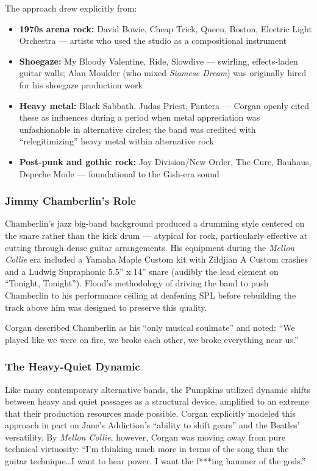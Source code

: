 \documentclass[11pt,letterpaper]{article}
\begin{document}
The approach drew explicitly from:
\begin{itemize}
  \item \textbf{1970s arena rock:} David Bowie, Cheap Trick, Queen, Boston, Electric Light Orchestra --- artists who used the studio as a compositional instrument
  \item \textbf{Shoegaze:} My Bloody Valentine, Ride, Slowdive --- swirling, effects-laden guitar walls; Alan Moulder (who mixed \textit{Siamese Dream}) was originally hired for his shoegaze production work
  \item \textbf{Heavy metal:} Black Sabbath, Judas Priest, Pantera --- Corgan openly cited these as influences during a period when metal appreciation was unfashionable in alternative circles; the band was credited with ``relegitimizing'' heavy metal within alternative rock
  \item \textbf{Post-punk and gothic rock:} Joy Division/New Order, The Cure, Bauhaus, Depeche Mode --- foundational to the Gish-era sound
\end{itemize}

\subsubsection{Jimmy Chamberlin's Role}

Chamberlin's jazz big-band background produced a drumming style centered on the snare rather than the kick drum --- atypical for rock, particularly effective at cutting through dense guitar arrangements. His equipment during the \textit{Mellon Collie} era included a Yamaha Maple Custom kit with Zildjian A Custom crashes and a Ludwig Supraphonic 5.5'' x 14'' snare (audibly the lead element on ``Tonight, Tonight''). Flood's methodology of driving the band to push Chamberlin to his performance ceiling at deafening SPL before rebuilding the track above him was designed to preserve this quality.

Corgan described Chamberlin as his ``only musical soulmate'' and noted: ``We played like we were on fire, we broke each other, we broke everything near us.''

\subsubsection{The Heavy-Quiet Dynamic}

Like many contemporary alternative bands, the Pumpkins utilized dynamic shifts between heavy and quiet passages as a structural device, amplified to an extreme that their production resources made possible. Corgan explicitly modeled this approach in part on Jane's Addiction's ``ability to shift gears'' and the Beatles' versatility. By \textit{Mellon Collie}, however, Corgan was moving away from pure technical virtuosity: ``I'm thinking much more in terms of the song than the guitar technique\ldots I want to hear power. I want the f***ing hammer of the gods.''
\end{document}
